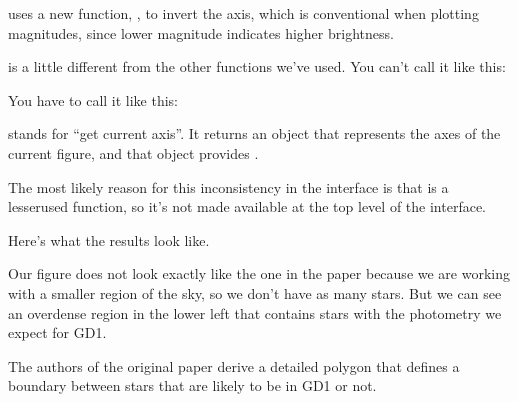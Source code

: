 \documentclass[letterpaper,10pt,english]{sphinxmanual}
\begin{document}
 uses a new function, , to invert the  axis, which is conventional when plotting magnitudes, since lower magnitude indicates higher brightness.

 is a little different from the other functions we’ve used.  You can’t call it like this:

\begin{sphinxVerbatim}[commandchars=\\\{\}]
          
\end{sphinxVerbatim}

You have to call it like this:

\begin{sphinxVerbatim}[commandchars=\\\{\}]
          
\end{sphinxVerbatim}

 stands for “get current axis”.  It returns an object that represents the axes of the current figure, and that object provides .

 The most likely reason for this inconsistency in the interface is that  is a lesser\sphinxhyphen{}used function, so it’s not made available at the top level of the interface.

Here’s what the results look like.

\begin{sphinxVerbatim}[commandchars=\\\{\}]
\end{sphinxVerbatim}

\noindent{}

Our figure does not look exactly like the one in the paper because we are working with a smaller region of the sky, so we don’t have as many stars.  But we can see an overdense region in the lower left that contains stars with the photometry we expect for GD\sphinxhyphen{}1.

The authors of the original paper derive a detailed polygon that defines a boundary between stars that are likely to be in GD\sphinxhyphen{}1 or not.
\end{document}
